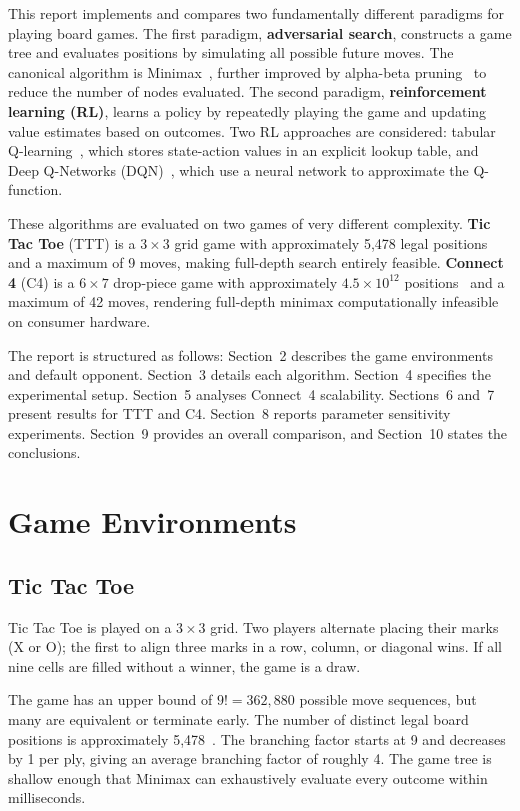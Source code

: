 \documentclass[12pt, a4paper]{article}
\begin{document}
This report implements and compares two fundamentally different paradigms for playing board games.
The first paradigm, \textbf{adversarial search}, constructs a game tree and evaluates positions by
simulating all possible future moves. The canonical algorithm is Minimax~\cite{russell2010},
further improved by alpha-beta pruning~\cite{knuth1975} to reduce the number of nodes evaluated.
The second paradigm, \textbf{reinforcement learning (RL)}, learns a policy by repeatedly playing
the game and updating value estimates based on outcomes. Two RL approaches are considered:
tabular Q-learning~\cite{watkins1992}, which stores state-action values in an explicit lookup
table, and Deep Q-Networks (DQN)~\cite{mnih2015}, which use a neural network to approximate
the Q-function.

These algorithms are evaluated on two games of very different complexity.
\textbf{Tic Tac Toe} (TTT) is a $3\times3$ grid game with approximately 5,478 legal positions
and a maximum of 9 moves, making full-depth search entirely feasible.
\textbf{Connect 4} (C4) is a $6\times7$ drop-piece game with approximately
$4.5 \times 10^{12}$ positions~\cite{allis1988} and a maximum of 42 moves, rendering full-depth
minimax computationally infeasible on consumer hardware.

The report is structured as follows: Section~2 describes the game environments and default
opponent. Section~3 details each algorithm. Section~4 specifies the experimental setup.
Section~5 analyses Connect~4 scalability. Sections~6 and~7 present results for TTT and C4.
Section~8 reports parameter sensitivity experiments. Section~9 provides an overall comparison,
and Section~10 states the conclusions.


\section{Game Environments}

\subsection{Tic Tac Toe}

Tic Tac Toe is played on a $3\times3$ grid. Two players alternate placing their marks (X or O);
the first to align three marks in a row, column, or diagonal wins. If all nine cells are filled
without a winner, the game is a draw.

The game has an upper bound of $9! = 362{,}880$ possible move sequences, but many are equivalent
or terminate early. The number of distinct legal board positions is approximately
5,478~\cite{russell2010}. The branching factor starts at 9 and decreases by 1 per ply, giving an
average branching factor of roughly 4. The game tree is shallow enough that Minimax can
exhaustively evaluate every outcome within milliseconds.
\end{document}
